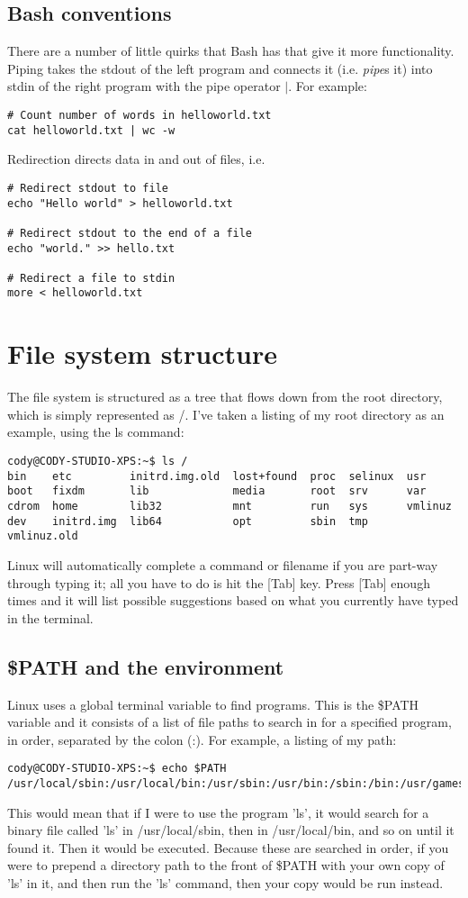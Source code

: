 \documentclass{article}
\begin{document}
\subsection{Bash conventions}
There are a number of little quirks that Bash has that give it more functionality.
Piping takes the stdout of the left program and connects it (i.e. \emph{pipe}s it) into stdin of the right program with the pipe operator $|$. For example:
\begin{verbatim}
# Count number of words in helloworld.txt
cat helloworld.txt | wc -w 
\end{verbatim}
Redirection directs data in and out of files, i.e. 
\begin{verbatim}
# Redirect stdout to file
echo "Hello world" > helloworld.txt

# Redirect stdout to the end of a file
echo "world." >> hello.txt

# Redirect a file to stdin
more < helloworld.txt
\end{verbatim}

\section{File system structure}
The file system is structured as a tree that flows down from the root directory, which is simply represented as /. I've taken a listing of my root directory as an example, using the ls command:
\begin{verbatim}
cody@CODY-STUDIO-XPS:~$ ls /
bin    etc         initrd.img.old  lost+found  proc  selinux  usr
boot   fixdm       lib             media       root  srv      var
cdrom  home        lib32           mnt         run   sys      vmlinuz
dev    initrd.img  lib64           opt         sbin  tmp      vmlinuz.old
\end{verbatim}

Linux will automatically complete a command or filename if you are part-way through typing it; all you have to do is hit the [Tab] key. Press [Tab] enough times and it will list possible suggestions based on what you currently have typed in the terminal.

\subsection{\$PATH and the environment}
Linux uses a global terminal variable to find programs. This is the \$PATH variable and it consists of a list of file paths to search in for a specified program, in order, separated by the colon (:). For example, a listing of my path:
\begin{verbatim}
cody@CODY-STUDIO-XPS:~$ echo $PATH
/usr/local/sbin:/usr/local/bin:/usr/sbin:/usr/bin:/sbin:/bin:/usr/games
\end{verbatim}
This would mean that if I were to use the program 'ls', it would search for a binary file called 'ls' in /usr/local/sbin, then in /usr/local/bin, and so on until it found it. Then it would be executed. Because these are searched in order, if you were to prepend a directory path to the front of \$PATH with your own copy of 'ls' in it, and then run the 'ls' command, then your copy would be run instead.
\end{document}
